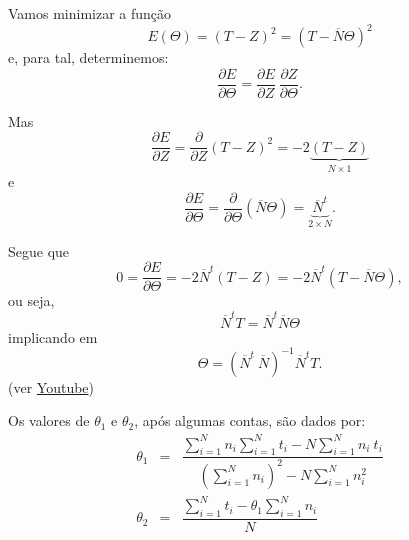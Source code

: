 \begin{exercise}
\begin{description}
{Vamos minimizar a função
\[E(\Theta)
= (T-Z)^2 = (T-\overline{N}\Theta)^2
\]
e, para tal, determinemos:
\[
\dfrac{\partial E}{\partial \Theta}
= \dfrac{\partial E}{\partial Z}\ \dfrac{\partial Z}{\partial \Theta}.\]

Mas
\[
\dfrac{\partial E}{\partial Z}
= \dfrac{\partial}{\partial Z} (T-Z)^2 = -2 \underbrace{(T-Z)}_{N \times 1}
\]
e
\[
\dfrac{\partial E}{\partial \Theta}
= \dfrac{\partial}{\partial \Theta} (\overline{N}\Theta) =  \underbrace{\overline{N}^t}_{2 \times N}.
\]

Segue que
\[0
= \dfrac{\partial E}{\partial \Theta}
= -2 \overline{N}^t (T-Z)
= -2 \overline{N}^t (T-\overline{N}\Theta),
\]
ou seja,
\[
\overline{N}^t T = \overline{N}^t \overline{N} \Theta
\]
implicando em
\[
\Theta = (\overline{N}^t\ \overline{N})^{-1} \overline{N}^t T.
\]
(ver \href{https://www.youtube.com/watch?v=txnrFZG7Ugs&ab_channel=LeonardoOlivi}{Youtube})


Os valores de \(\theta_1\) e \(\theta_2\), após algumas contas, são dados por:
\[\begin{array}{rcl}
\theta_1 &=& \dfrac{\displaystyle\sum_{i=1}^{N} n_i \sum_{i=1}^{N} t_i - N \sum_{i=1}^{N} n_i\ t_i}{\displaystyle\left(\sum_{i=1}^{N} n_i\right)^2 - N \sum_{i=1}^{N} n_i^2} \\
\theta_2 &=& \dfrac{\displaystyle\sum_{i=1}^{N} t_i - \theta_1 \sum_{i=1}^{N} n_i}{N}
\end{array}
\]

}
\end{description}
\end{exercise}
